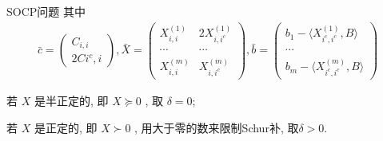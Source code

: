 \documentclass[slidestop,compress,mathserif,UTF8]{beamer}
\numberwithin{equation}{section}
\begin{document}
            \begin{frame}[t]{SOCP问题}
                其中
                \begin{equation}
                    \begin{split}\label{SOCPCondition}
                            \bar{c}
                        =	\begin{pmatrix} C_{i, i} \\ 2C{i^c, i} \end{pmatrix},
                            \bar{X}
                        =	\begin{pmatrix}
                                X^(1)_{i, i} & 2X^(1)_{i, i^c} \\
                                \cdots & \cdots \\
                                X^(m)_{i, i} & X^(m)_{i, i^c}
                            \end{pmatrix},
                            \bar{b}
                        =	\begin{pmatrix}
                                b_1 - \langle{X^(1)_{i^c, i^c}, B}\rangle \\
                                \cdots \\
                                b_m - \langle{X^(m)_{i^c, i^c}, B}\rangle 
                            \end{pmatrix}
                    \end{split}
                \end{equation}
                
                若 $X$ 是半正定的, 即 $X \succeq 0$ , 取 $\delta = 0$; 
                
                若 $X$ 是正定的, 即 $X \succ 0$ , 用大于零的数来限制Schur补, 取$\delta > 0$.
            \end{frame}
\end{document}
